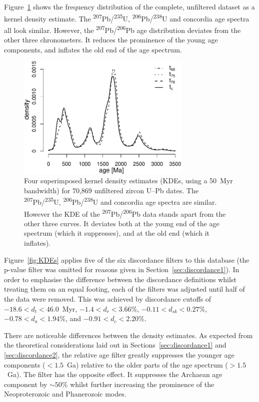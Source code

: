 \documentclass{article}
\begin{document}
Figure~\ref{fig:KDE} shows the frequency distribution of the complete,
unfiltered dataset as a kernel density estimate. The
\textsuperscript{207}Pb/\textsuperscript{235}U,
\textsuperscript{206}Pb/\textsuperscript{238}U and concordia age
spectra all look similar. However, the
\textsuperscript{207}Pb/\textsuperscript{206}Pb age distribution
deviates from the other three chronometers. It reduces the prominence
of the young age components, and inflates the old end of the age
spectrum.

\begin{figure}[t]
  \includegraphics[width=8.3cm]{KDE.pdf}
  \caption{Four superimposed kernel density estimates (KDEs, using a
    50~Myr bandwidth) for 70,869 unfiltered zircon U--Pb dates. The
    \textsuperscript{207}Pb/\textsuperscript{235}U,
    \textsuperscript{206}Pb/\textsuperscript{238}U and concordia age
    spectra are similar.  However the KDE of the
    \textsuperscript{207}Pb/\textsuperscript{206}Pb data stands apart
    from the other three curves. It deviates both at the young end of
    the age spectrum (which it suppresses), and at the old end (which
    it inflates).  }
  \label{fig:KDE}
\end{figure}

Figure~\ref{fig:KDEs} applies five of the six discordance filters to
this database (the p-value filter was omitted for reasons given in
Section~\ref{sec:discordance1}). In order to emphasise the difference
between the discordance definitions whilst treating them on an equal
footing, each of the filters was adjusted until half of the data were
removed. This was achieved by discordance cutoffs of
$-18.6<d_t<46.0$~Myr, $-1.4<d_r<3.66$\%, $-0.11<d_{sk}<0.27$\%,
$-0.78<d_{a}<1.94$\%, and $-0.91<d_c<2.20$\%.

There are noticeable differences between the density estimates.  As
expected from the theoretical considerations laid out in
Sections~\ref{sec:discordance1} and \ref{sec:discordance2}, the
relative age filter greatly suppresses the younger age components
($<1.5$~Ga) relative to the older parts of the age spectrum
($>1.5$~Ga). The \citet{stacey1975} filter has the opposite effect.
It suppresses the Archaean age component by $\sim{50}$\% whilst
further increasing the prominence of the Neoproterozoic and
Phanerozoic modes.
\end{document}
